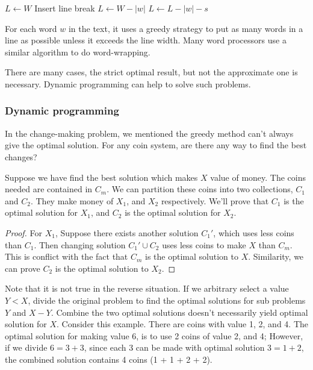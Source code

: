 \documentclass[UTF8]{article}
\begin{document}
\begin{algorithmic}[1]
\State $L \gets W$
    \State Insert line break
    \State $L \gets W - |w|$
  \Else
    \State $L \gets L - |w| - s$
  \EndIf
\EndFor
\end{algorithmic}

For each word $w$ in the text, it uses a greedy strategy to put as many words in
a line as possible unless it exceeds the line width. Many word processors use a
similar algorithm to do word-wrapping.

There are many cases, the strict optimal result, but not the approximate one is
necessary. Dynamic programming can help to solve such problems.

\subsubsection{Dynamic programming}

In the change-making problem, we mentioned the greedy method can't always give
the optimal solution. For any coin system, are there any way to find the best
changes?

Suppose we have find the best solution which makes $X$ value of money. The coins
needed are contained in $C_m$. We can partition these coins into two collections,
$C_1$ and $C_2$. They make money of $X_1$, and $X_2$ respectively. We'll prove
that $C_1$ is the optimal solution for $X_1$, and $C_2$ is
the optimal solution for $X_2$.

\begin{proof}
For $X_1$, Suppose there exists another solution $C_1'$, which uses less coins
than $C_1$. Then changing solution $C_1' \cup C_2$ uses less coins to make
$X$ than $C_m$. This is conflict with the fact that $C_m$ is the optimal
solution to $X$. Similarity, we can prove $C_2$ is the optimal solution to
$X_2$.
\end{proof}

Note that it is not true in the reverse situation. If we arbitrary select a
value $Y<X$, divide the original problem to find the optimal solutions for
sub problems $Y$ and $X-Y$. Combine the two optimal solutions doesn't
necessarily yield optimal solution for $X$. Consider this example.
There are coins with value 1, 2, and 4. The optimal solution for making
value 6, is to use 2 coins of value 2, and 4; However, if we divide
$6 = 3 + 3$, since each 3 can be made with optimal solution $3 = 1 + 2$,
the combined solution contains 4 coins (1 + 1 + 2 + 2).
\end{document}
